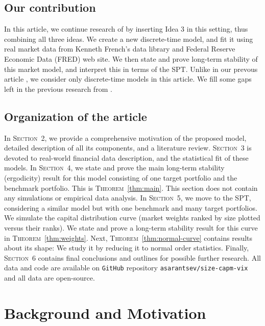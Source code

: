 \documentclass[12pt]{amsart}
\begin{document}
\subsection{Our contribution} In this article, we continue research of \cite{CAPM-size} by inserting Idea 3 in this setting, thus combining all three ideas. We create a new discrete-time model, and fit it using real market data from Kenneth French's data library and Federal Reserve Economic Data (FRED) web site. We then state and prove long-term stability of this market model, and interpret this in terms of the SPT. Unlike in our prevous article \cite{CAPM-size}, we consider only discrete-time models in this article. We fill some gaps left in the previous research from \cite{CAPM-size}.

\subsection{Organization of the article} In \textsc{Section}~2, we provide a comprehensive motivation of the proposed model, detailed description of all its components, and a literature review. \textsc{Section}~3 is devoted to real-world financial data description, and the statistical fit of these models. In \textsc{Section}~4, we state and prove the main long-term stability (ergodicity) result for this model consisting of one target portfolio and the benchmark portfolio. This is  \textsc{Theorem}~\ref{thm:main}. This section does not contain any simulations or empirical data analysis. In \textsc{Section}~5, we move to the SPT, considering a similar model but with one benchmark and many target portfolios. We simulate the capital distribution curve (market weights ranked by size plotted versus their ranks). We state and prove a long-term stability result for this curve in \textsc{Theorem}~\ref{thm:weights}. Next, \textsc{Theorem}~\ref{thm:normal-curve} contains results about its shape: We study it by reducing it to normal order statistics. Finally, \textsc{Section}~6 contains final conclusions and outlines for possible further research. All data and code are available on \texttt{GitHub} repository \texttt{asarantsev/size-capm-vix} and all data are open-source. 

\section{Background and Motivation}
\end{document}
